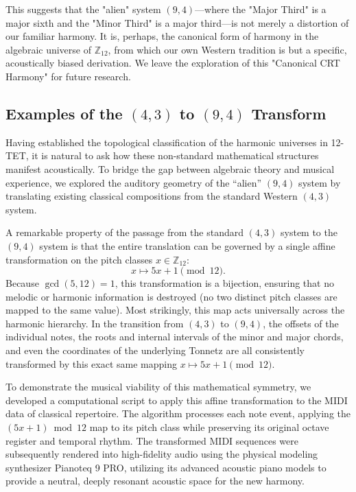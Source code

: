 \documentclass[12pt,letterpaper]{amsart}
\begin{document}
This suggests that the "alien" system $(9,4)$—where the "Major Third" is a major sixth and the "Minor Third" is a major third—is not merely a distortion of our familiar harmony. It is, perhaps, the canonical form of harmony in the algebraic universe of $\mathbb{Z}_{12}$, from which our own Western tradition is but a specific, acoustically biased derivation. We leave the exploration of this "Canonical CRT Harmony" for future research.

\subsection{Examples of the $(4,3)$ to $(9,4)$ Transform}

Having established the topological classification of the harmonic universes in 12-TET, it is natural to ask how these non-standard mathematical structures manifest acoustically. To bridge the gap between algebraic theory and musical experience, we explored the auditory geometry of the ``alien'' $(9,4)$ system by translating existing classical compositions from the standard Western $(4,3)$ system.

A remarkable property of the passage from the standard $(4,3)$ system to the $(9,4)$ system is that the entire translation can be governed by a single affine transformation on the pitch classes $x \in \mathbb{Z}_{12}$:
\begin{equation}
    x \mapsto 5x + 1 \pmod{12}.
\end{equation}
Because $\gcd(5,12)=1$, this transformation is a bijection, ensuring that no melodic or harmonic information is destroyed (no two distinct pitch classes are mapped to the same value). Most strikingly, this map acts universally across the harmonic hierarchy. In the transition from $(4,3)$ to $(9,4)$, the offsets of the individual notes, the roots and internal intervals of the minor and major chords, and even the coordinates of the underlying Tonnetz are all consistently transformed by this exact same mapping $x \mapsto 5x + 1 \pmod{12}$. 

To demonstrate the musical viability of this mathematical symmetry, we developed a computational script to apply this affine transformation to the MIDI data of classical repertoire. The algorithm processes each note event, applying the $(5x+1)\bmod 12$ map to its pitch class while preserving its original octave register and temporal rhythm. The transformed MIDI sequences were subsequently rendered into high-fidelity audio using the physical modeling synthesizer Pianoteq 9 PRO, utilizing its advanced acoustic piano models to provide a neutral, deeply resonant acoustic space for the new harmony.
\end{document}
